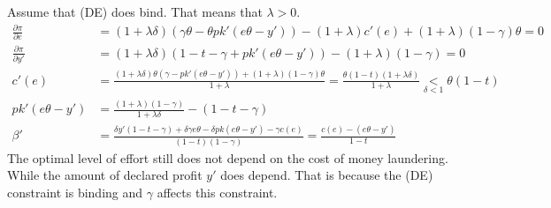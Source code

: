 \documentclass[a4paper]{article}
\begin{document}
Assume that (DE) does bind. That means that $\lambda > 0$.
\begin{align*}
\frac{\partial \pi}{\partial e} &= (1 + \lambda \delta)(\gamma \theta - \theta p k'(e \theta - y')) - (1+\lambda)c'(e) + (1+\lambda)(1-\gamma)\theta = 0\\
\frac{\partial \pi}{\partial y'} &= (1+\lambda \delta)(1 - t - \gamma+pk'(e\theta - y')) - (1+\lambda)(1-\gamma) = 0\\
c'(e) &= \frac{(1+\lambda \delta)\theta(\gamma - pk'(e \theta - y'))+ (1+\lambda)(1-\gamma)\theta}{1+\lambda} = \frac{\theta(1-t)(1 + \lambda \delta)}{1+\lambda}\underset{\delta < 1}{<} \theta(1-t)\\
pk'(e\theta - y') &= \frac{(1+\lambda)(1-\gamma)}{1+\lambda \delta} - (1 - t - \gamma)\\
\beta' &= \frac{\delta y'(1 - t - \gamma) + \delta \gamma e \theta - \delta p k(e \theta - y') - \gamma c(e)}{(1-t)(1-\gamma)} = \frac{c(e) - (e \theta - y')}{1-t}
\end{align*}
The optimal level of effort still does not depend on the cost of money laundering. While the amount of declared profit $y'$ does depend. That is because the (DE) constraint is binding and $\gamma$ affects this constraint.
\end{document}
